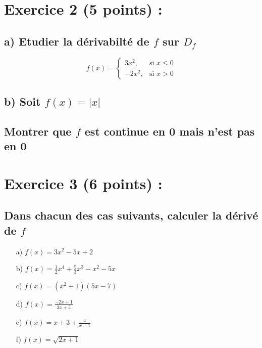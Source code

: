 \documentclass{article}
\begin{document}
\section*{Exercice 2 (5 points) :}
\subsection*{a) Etudier la dérivabilté de $f$ sur $D_{f}$}
\[ f(x) = \begin{cases} 
  3x^{2}, & \text{si } x \leq 0 \\
  -2x^{2}, & \text{si } x > 0 
\end{cases} \]
\subsection*{b) Soit $f(x)=|x|$ }
\subsection*{ Montrer que $f$ est continue en 0 mais n'est pas en 0 }
\section*{Exercice 3 (6 points) :}
\subsection*{ Dans chacun des cas suivants, calculer la dérivé de $f$}
\begin{itemize}
\item[a)]$f(x)=3x^{2}-5x+2$
\item[b)]$f(x)=\frac{1}{2}x^{4}+\frac{5}{3}x^{3}-x^{2}-5x$
\item[c)]$f(x)=(x^{2}+1)(5x-7)$
\item[d)]$f(x)=\frac{-2x+1}{3x+5}$
\item[e)]$f(x)=x+3+\frac{4}{x-1}$
\item[f)]$f(x)=\sqrt{2x+1}$
\end{itemize}
\end{document}
